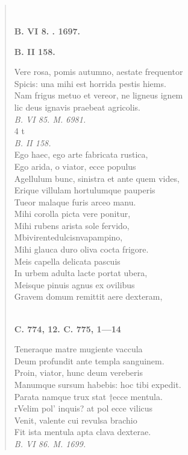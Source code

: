 \documentclass[11pt, a4paper]{report}
\begin{document}
            \subsection*{}
      \begin{verse}
        ﻿\pagebreak 
    \begin{center} \textbf{B. VI 8. . 1697.} \end{center} \marginpar{[40]} \begin{center} \textbf{B. II 158.} \end{center}Vere rosa, pomis autumno, aestate frequentor \\ Spicis: una mihi est horrida pestis hiems. \\ Nam frigus metuo et vereor, ne ligneus ignem \\ lic deus ignavis praebeat agricolis. \\ \textit{B. VI 85. M. 6981.} \\ 4 t \\ \textit{B. II 158.} \\ Ego haec, ego arte fabricata rustica, \\ Ego arida, o viator, ecce populus \\ Agellulum bunc, sinistra et ante quem vides, \\ Erique villulam hortulumque pauperis \\ Tueor malaque furis arceo manu. \\ Mihi corolla picta vere ponitur, \\ Mihi rubens arista sole fervido, \\ Mbivirentedulcisnvapampino, \\ Mihi glauca duro oliva cocta frigore. \\ Meis capella delicata pascuis \\ In urbem adulta lacte portat ubera, \\ Meisque pinuis agnus ex ovilibus \\ Gravem domum remittit aere dexteram, \\ 
        ﻿\pagebreak 
    \begin{center} \textbf{C. 774, 12. C. 775, 1—14} \end{center} \marginpar{[260]} Teneraque matre mugiente vaccula \\ Deum profundit ante templa sanguinem. \\ Proin, viator, hunc deum vereberis \\ Manumque sursum habebis: hoc tibi expedit. \\ Parata namque trux stat  \lbrack †ecce \rbrack  mentula. \\ rVelim pol’ inquis? at pol ecce vilicus \\ Venit, valente cui revulsa brachio \\ Fit ista mentula apta clava dexterae. \\ \textit{B. VI 86. M. 1699.} \\ 
      \end{verse}
  
\end{document}
